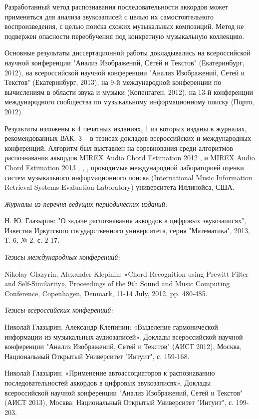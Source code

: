 Разработанный метод распознавания последовательности аккордов может применяться
для анализа звукозаписей с целью их самостоятельного воспроизведения, с целью
поиска схожих музыкальных композиций. Метод не подвержен опасности переобучения
под конкретную музыкальную коллекцию.

Основные результаты диссертационной работы докладывались на всероссийской
научной конференции "Анализ Изображений, Сетей и Текстов" (Екатеринбург, 2012),
на всероссийской научной конференции "Анализ Изображений, Сетей и Текстов"
(Екатеринбург, 2013), на 9-й международной конференции по вычислениям в области
звука и музыки (Копенгаген, 2012), на 13-й конференции международного
сообщества по музыкальному информационному поиску (Порто, 2012).

Результаты изложены в 4 печатных изданиях, 1 из которых изданы в журналах,
рекомендованных ВАК, 3 -- в тезисах докладов всероссийских и международных
конференций. Алгоритм был выставлен на соревнования среди алгоритмов
распознавания аккордов MIREX Audio Chord Estimation 2012 \cite{ACEMrx2012},
\cite{ACEMcg2012} и MIREX Audio Chord Estimation 2013 \cite{ACEMirex20092013},
\cite{ACEBillboard20122013}, \cite{ACEBillboard20132013}, проводимые
международной лабораторией оценки систем музыкального информационного поиска
(International Music Information Retrieval Systems Evaluation Laboratory)
университета Иллинойса, США.

\textit{Журналы из перечня ведущих периодических изданий:}

Н. Ю. Глазырин: "О задаче распознавания аккордов в цифровых звукозаписях",
Известия Иркутского государственного университета, серия "Математика", 2013, Т.
6, № 2. с. 2-17.

\textit{Тезисы международных конференций:}

Nikolay Glazyrin, Alexander Klepinin: «Chord Recognition using Prewitt Filter
and Self-Similarity», Proceedings of the 9th Sound and Music Computing
Conference, Copenhagen, Denmark, 11-14 July, 2012, pp. 480-485.

\textit{Тезисы всероссийских конференций:}

Николай Глазырин, Александр Клепинин: «Выделение гармонической информации из
музыкальных аудиозаписей». Доклады всероссийской научной конференции "Анализ
Изображений, Сетей и Текстов" (АИСТ 2012), Москва, Национальный Открытый
Университет "Интуит", с. 159-168.

Николай Глазырин: «Применение автоассоциаторов к распознаванию
последовательностей аккордов в цифровых звукозаписях», Доклады всероссийской
научной конференции "Анализ Изображений, Сетей и Текстов" (АИСТ 2013), Москва,
Национальный Открытый Университет "Интуит", с. 199-203.

